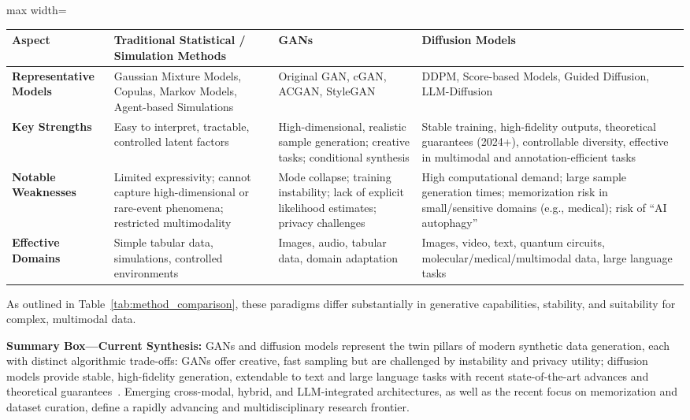 \documentclass[sigconf]{acmart}
\begin{document}
\begin{table*}[htbp]
\centering
\caption{Comparison of Classical, GAN, and Diffusion Approaches to Synthetic Data Generation}
\label{tab:method_comparison}
\begin{adjustbox}{max width=\textwidth}
\begin{tabular}{@{}llll@{}}
\toprule
\textbf{Aspect} & \textbf{Traditional Statistical / Simulation Methods} & \textbf{GANs} & \textbf{Diffusion Models} \\
\midrule
\textbf{Representative Models} & Gaussian Mixture Models, Copulas, Markov Models, Agent-based Simulations & Original GAN, cGAN, ACGAN, StyleGAN & DDPM, Score-based Models, Guided Diffusion, LLM-Diffusion \\
\textbf{Key Strengths} & Easy to interpret, tractable, controlled latent factors & High-dimensional, realistic sample generation; creative tasks; conditional synthesis & Stable training, high-fidelity outputs, theoretical guarantees (2024+), controllable diversity, effective in multimodal and annotation-efficient tasks \\
\textbf{Notable Weaknesses} & Limited expressivity; cannot capture high-dimensional or rare-event phenomena; restricted multimodality & Mode collapse; training instability; lack of explicit likelihood estimates; privacy challenges & High computational demand; large sample generation times; memorization risk in small/sensitive domains (e.g., medical); risk of “AI autophagy” \\
\textbf{Effective Domains} & Simple tabular data, simulations, controlled environments & Images, audio, tabular data, domain adaptation & Images, video, text, quantum circuits, molecular/medical/multimodal data, large language tasks \\
\bottomrule
\end{tabular}
\end{adjustbox}
\end{table*}

As outlined in Table~\ref{tab:method_comparison}, these paradigms differ substantially in generative capabilities, stability, and suitability for complex, multimodal data. 

\vspace{0.5em}
\noindent
\textbf{Summary Box---Current Synthesis:} GANs and diffusion models represent the twin pillars of modern synthetic data generation, each with distinct algorithmic trade-offs: GANs offer creative, fast sampling but are challenged by instability and privacy utility; diffusion models provide stable, high-fidelity generation, extendable to text and large language tasks with recent state-of-the-art advances and theoretical guarantees~\cite{ref10,ref15,ref16,ref21,ref24,ref25,ref26,ref89}. Emerging cross-modal, hybrid, and LLM-integrated architectures, as well as the recent focus on memorization and dataset curation, define a rapidly advancing and multidisciplinary research frontier.
\end{document}
